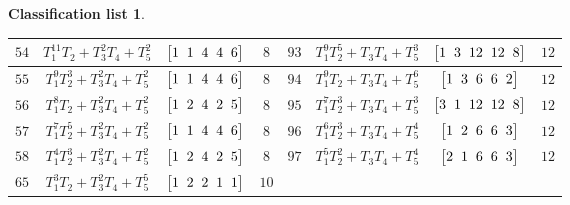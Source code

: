 \documentclass[pdftex]{sigma}%
\theoremstyle{definition}
\newtheorem{class-list}[thm]{Classification list}
\numberwithin{equation}{section}
\begin{document}
\begin{class-list}
\begin{table}[t!]
\begin{tabu}{c|c|c|c||c|c|c|c}
\\
\hline
${54}$&${T_{1}^{11}T_{2}+T_{3}^{2}T_{4}+T_{5}^{2}}$
&$\arraycolsep=1mm\begin{bmatrix}{1} & {1} & {4} & {4} & {6}\end{bmatrix}$&${8}$
&${93}$&${T_{1}^{9}T_{2}^{5}+T_{3}T_{4}+T_{5}^{3}}$
&$\arraycolsep=1mm\begin{bmatrix}{1} & {3} & {12} & {12} & {8}\end{bmatrix}$&${12}$
\\
\hline
${55}$&${T_{1}^{9}T_{2}^{3}+T_{3}^{2}T_{4}+T_{5}^{2}}$
&$\arraycolsep=1mm\begin{bmatrix}{1} & {1} & {4} & {4} & {6}\end{bmatrix}$&${8}$
&${94}$&${T_{1}^{9}T_{2}+T_{3}T_{4}+T_{5}^{6}}$
&$\arraycolsep=1mm\begin{bmatrix}{1} & {3} & {6} & {6} & {2}\end{bmatrix}$&${12}$
\\
\hline
${56}$&${T_{1}^{8}T_{2}+T_{3}^{2}T_{4}+T_{5}^{2}}$
&$\arraycolsep=1mm\begin{bmatrix}{1} & {2} & {4} & {2} & {5}\end{bmatrix}$&${8}$
&${95}$&${T_{1}^{7}T_{2}^{3}+T_{3}T_{4}+T_{5}^{3}}$
&$\arraycolsep=1mm\begin{bmatrix}{3} & {1} & {12} & {12} & {8}\end{bmatrix}$&${12}$
\\
\hline
${57}$&${T_{1}^{7}T_{2}^{5}+T_{3}^{2}T_{4}+T_{5}^{2}}$
&$\arraycolsep=1mm\begin{bmatrix}{1} & {1} & {4} & {4} & {6}\end{bmatrix}$&${8}$
&${96}$&${T_{1}^{6}T_{2}^{3}+T_{3}T_{4}+T_{5}^{4}}$
&$\arraycolsep=1mm\begin{bmatrix}{1} & {2} & {6} & {6} & {3}\end{bmatrix}$&${12}$
\\
\hline
${58}$&${T_{1}^{4}T_{2}^{3}+T_{3}^{2}T_{4}+T_{5}^{2}}$
&$\arraycolsep=1mm\begin{bmatrix}{1} & {2} & {4} & {2} & {5}\end{bmatrix}$&${8}$
&${97}$&${T_{1}^{5}T_{2}^{2}+T_{3}T_{4}+T_{5}^{4}}$
&$\arraycolsep=1mm\begin{bmatrix}{2} & {1} & {6} & {6} & {3}\end{bmatrix}$&${12}$
\\
\hline
${65}$&${T_{1}^{3}T_{2}+T_{3}^{2}T_{4}+T_{5}^{5}}$
&$\arraycolsep=1mm\begin{bmatrix}{1} & {2} & {2} & {1} & {1}\end{bmatrix}$&${10}$

\end{tabu}
\end{table}
\end{class-list}
\end{document}
